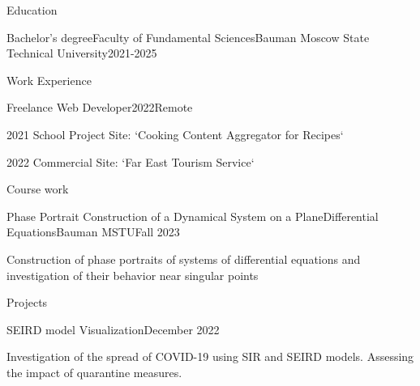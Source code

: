 \documentclass[]{kyvernitis-resume}
\begin{document}
\resumeheader
{}
{}
{}



\begin{section}{Education}
    \begin{subsectionnobullet}{Bachelor's degree}{Faculty of Fundamental Sciences}{Bauman Moscow State Technical University}{2021-2025}
        
    \end{subsectionnobullet}
    
\end{section}

\begin{section}{Work Experience}
    \begin{subsection}{Freelance Web Developer}{}{2022}{Remote}
      \item 2021 School Project Site: `Cooking Content Aggregator for Recipes`
      \item 2022 Commercial Site: `Far East Tourism Service`
    \end{subsection}
\end{section}


\begin{section}{Course work}
\begin{subsectionnobullet}{Phase Portrait Construction of a Dynamical System on a Plane}{Differential Equations}{Bauman MSTU}{Fall 2023}
    \item{Construction of phase portraits of systems of differential equations and investigation of their behavior near singular points}
\end{subsectionnobullet}

\end{section}


\begin{section}{Projects}
    \begin{subsectionnobullet}{SEIRD model Visualization}{}{December 2022}{}
        \item Investigation of the spread of COVID-19 using SIR and SEIRD models. Assessing the impact of quarantine measures.
    \end{subsectionnobullet}
\end{section}
\end{document}
